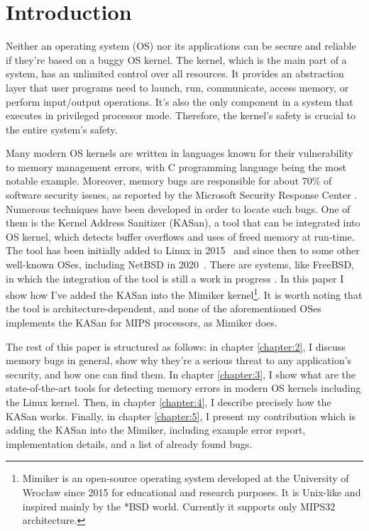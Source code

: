 \documentclass[shortabstract, manyadvisors, english, mgr]{iithesis}
\author{Julian Pszczołowski}
\theoremstyle{definition} \newtheorem*{definition}{Definicja}
\theoremstyle{definition} \newtheorem*{example}{Przykład}
\theoremstyle{definition} \newtheorem*{remark}{Uwaga}
\begin{document}
\chapter{Introduction}
\label{chapter:1}

Neither an operating system (OS) nor its applications can be secure and reliable if they're based on a buggy OS kernel. The kernel, which is the main part of a system, has an unlimited control over all resources. It provides an abstraction layer that user programs need to launch, run, communicate, access memory, or perform input/output operations. It's also the only component in a system that executes in privileged processor mode. Therefore, the kernel's safety is crucial to the entire system's safety.

Many modern OS kernels are written in languages known for their vulnerability to memory management errors, with C programming language being the most notable example. Moreover, memory bugs are responsible for about 70\% of software security issues, as reported by the Microsoft Security Response Center \cite{bib:msrc-memory-issues}. Numerous techniques have been developed in order to locate such bugs. One of them is the Kernel Address Sanitizer (KASan), a tool that can be integrated into OS kernel, which detects buffer overflows and uses of freed memory at run-time. The tool has been initially added to Linux in 2015~\cite{bib:linux-kasan} and since then to some other well-known OSes, including NetBSD in 2020~\cite{bib:netbsd-9-notes}. There are systems, like FreeBSD, in which the integration of the tool is still a work in progress \cite{bib:freebsd-kasan}. In this paper I show how I've added the KASan into the Mimiker kernel\footnote{Mimiker \cite{bib:mimiker} is an open-source operating system developed at the University of Wrocław since 2015 for educational and research purposes. It is Unix-like and inspired mainly by the *BSD world. Currently it supports only MIPS32 architecture.}. It is worth noting that the tool is architecture-dependent, and none of the aforementioned OSes implements the KASan for MIPS processors, as Mimiker does.

The rest of this paper is structured as follows: in chapter \ref{chapter:2}, I discuss memory bugs in general, show why they're a serious threat to any application's security, and how one can find them. In chapter \ref{chapter:3}, I show what are the state-of-the-art tools for detecting memory errors in modern OS kernels including the Linux kernel. Then, in chapter \ref{chapter:4}, I describe precisely how the KASan works. Finally, in chapter \ref{chapter:5}, I present my contribution which is adding the KASan into the Mimiker, including example error report, implementation details, and a list of already found bugs.
\end{document}
